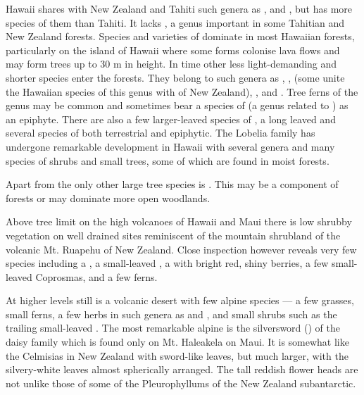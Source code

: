 Hawai{\okina}i shares with New Zealand and Tahiti such genera as ,  and , but has more species of them than Tahiti.
It lacks , a genus important in some Tahitian and New Zealand forests.
Species and varieties of  dominate in most Hawaiian forests, particularly on the island of Hawai{\okina}i where some forms colonise lava flows and may form trees up to 30 m in height.
In time other less light-demanding and shorter species enter the forests.
They belong to such genera as , ,  (some unite the Hawaiian species of this genus with  of New Zealand), ,  and .
Tree ferns of the genus  may be common and sometimes bear a species of  (a genus related to ) as an epiphyte.
There are also a few larger-leaved species of , a long leaved  and several species of  both terrestrial and epiphytic.
The Lobelia family has undergone remarkable development in Hawai{\okina}i with several genera and many species of shrubs and small trees, some of which are found in moist forests.

Apart from  the only other large tree species is .
This may be a component of  forests or may dominate more open woodlands.

Above tree limit on the high volcanoes of Hawai{\okina}i and Maui there is low shrubby vegetation on well drained sites reminiscent of the mountain shrubland of the volcanic Mt.
Ruapehu of New Zealand.
Close inspection however reveals very few species including a , a small-leaved , a  with bright red, shiny berries, a few small-leaved Coprosmas, and a few ferns.

At higher levels still is a volcanic desert with few alpine species --- a few grasses, small ferns, a few herbs in such genera as  and , and small shrubs such as the trailing small-leaved .
The most remarkable alpine is the silversword () of the daisy family which is found only on Mt.
Haleakela on Maui.
It is somewhat like the Celmisias in New Zealand with sword-like leaves, but much larger, with the silvery-white leaves almost spherically arranged.
The tall reddish flower heads are not unlike those of some of the Pleurophyllums of the New Zealand subantarctic.

